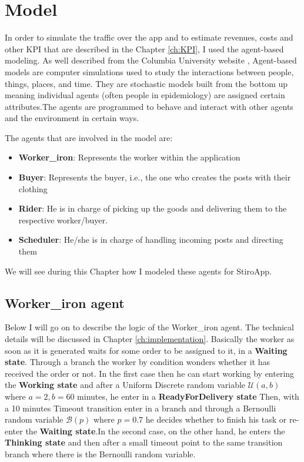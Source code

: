 \chapter{Model}
In order to simulate the traffic over the app and to estimate revenues, costs and other KPI that are described in the Chapter \ref{ch:KPI}, I used the agent-based modeling.
As well described from the Columbia University website \cite{columbia}, Agent-based models are computer simulations used to study the interactions between people, things, places, and time. They are stochastic models built from the bottom up meaning individual agents (often people in epidemiology) are assigned certain attributes.The agents are programmed to behave and interact with other agents and the environment in certain ways. \par
The agents that are involved in the model are:
\begin{itemize}
\item \textbf{Worker\_iron}: Represents the worker within the application
\item \textbf{Buyer}: Represents the buyer, i.e., the one who creates the posts with their clothing
\item \textbf{Rider}: He is in charge of picking up the goods and delivering them to the respective worker/buyer.
\item \textbf{Scheduler}: He/she is in charge of handling incoming posts and directing them
\end{itemize}
We will see during this Chapter how I modeled these agents for StiroApp.
\section{Worker\_iron agent}
Below I will go on to describe the logic of the Worker\_iron agent. The technical details will be discussed in Chapter \ref{ch:implementation}.
Basically the worker as soon as it is generated waits for some order to be assigned to it, in a \textbf{Waiting state}. 
Through a branch the worker by condition wonders whether it has received the order or not. In the first case then he can start working by entering the \textbf{Working state} and after a Uniform Discrete random variable $\mathcal{U}(a,b)$ where $a = 2, b = 60$ minutes, he enter in a \textbf{ReadyForDelivery state} Then, with a 10 minutes Timeout transition enter in a branch and through a Bernoulli random variable $\mathcal{B}(p)$ where $p = 0.7$ he decides whether to finish his task or re-enter the \textbf{Waiting state}.In the second case, on the other hand, he enters the \textbf{Thinking state} and then after a small timeout point to the same transition branch where there is the Bernoulli random variable.
